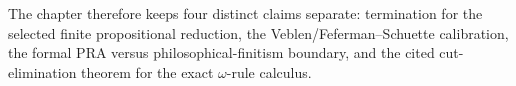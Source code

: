 The chapter therefore keeps four distinct claims separate: termination for the
selected finite propositional reduction, the Veblen/Feferman--Schuette
calibration, the formal PRA versus philosophical-finitism boundary, and the
cited cut-elimination theorem for the exact \(\omega\)-rule calculus.
